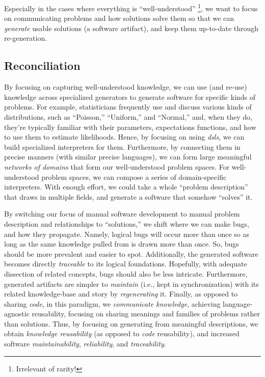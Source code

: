 Especially in the cases where everything is ``well-understood''
\cite{well-understood}\footnote{Irrelevant of rarity!}, we want to focus on
communicating problems and how solutions solve them so that we can
\textit{generate} usable solutions (a software artifact), and keep them
up-to-date through re-generation.

\subsection{Reconciliation}
\label{chap:ideology:sec:thoughts_of_generation:subsec:reconciliation}

By focusing on capturing well-understood \cite{well-understood} knowledge, we
can use (and re-use) knowledge across specialized generators to generate
software for specific kinds of problems. For example, statisticians frequently
use and discuss various kinds of distributions, such as ``Poisson,''
``Uniform,'' and ``Normal,'' and, when they do, they're typically familiar with
their parameters, expectations functions, and how to use them to estimate
likelihoods. Hence, by focusing on using \textit{\aclp{dsl}}, we can build
specialized interpreters for them. Furthermore, by connecting them in precise
manners (with similar precise languages), we can form large meaningful
\textit{networks of domains} \cite{Czarnecki2005} that form our well-understood
problem spaces. For well-understood problem spaces, we can compose a series of
domain-specific interpreters. With enough effort, we could take a whole
``problem description'' that draws in multiple fields, and generate a software
that somehow ``solves'' it.

By switching our focus of manual software development to manual problem
description and relationships to ``solutions,'' we shift where we can make bugs,
and how they propagate. Namely, logical bugs will occur more than once so as
long as the same knowledge pulled from is drawn more than once. So, bugs should
be more prevalent and easier to spot. Additionally, the generated software
becomes directly \textit{traceable} to its logical foundations. Hopefully, with
adequate dissection of related concepts, bugs should also be less intricate.
Furthermore, generated artifacts are simpler to \textit{maintain} (i.e., kept in
synchronization) with its related knowledge-base and story by
\textit{regenerating} it. Finally, as opposed to sharing \textit{code}, in this
paradigm, we \textit{communicate knowledge}, achieving language-agnostic
reusability, focusing on sharing meanings and families of problems rather than
solutions. Thus, by focusing on generating from meaningful descriptions, we
obtain \textit{knowledge reusability} (as opposed to \textit{code} reusability),
and increased software \textit{maintainability}, \textit{reliability}, and
\textit{traceability}.

